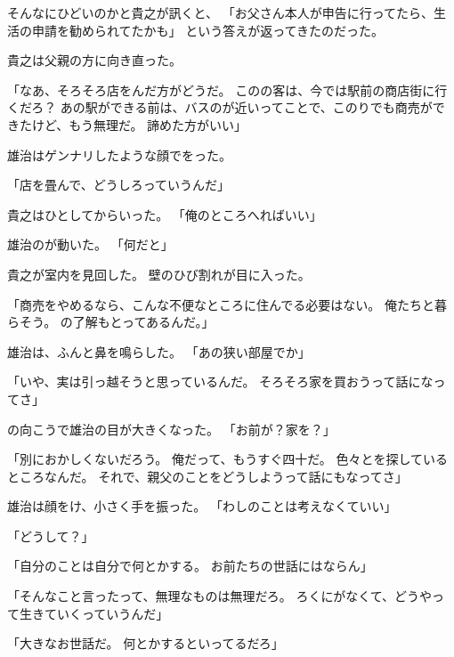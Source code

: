 \documentclass[chapter3.tex]{subfiles}
\begin{document}
\begin{CJK}{UTF8}{ipxm}
    そんなにひどいのかと貴之が訊くと、
    「お父さん本人が申告に行ってたら、生活の申請を勧められてたかも」
    という答えが返ってきたのだった。

    貴之は父親の方に向き直った。

    「なあ、そろそろ店をんだ方がどうだ。
    このの客は、今では駅前の商店街に行くだろ？
    あの駅ができる前は、バスのが近いってことで、このりでも商売ができたけど、もう無理だ。
    諦めた方がいい」

    雄治はゲンナリしたような顔でをった。

    「店を畳んで、どうしろっていうんだ」

    貴之はひとしてからいった。
    「俺のところへればいい」

    雄治のが動いた。
    「何だと」

    貴之が室内を見回した。
    壁のひび割れが目に入った。

    「商売をやめるなら、こんな不便なところに住んでる必要はない。
    俺たちと暮らそう。
    の了解もとってあるんだ。」

    雄治は、ふんと鼻を鳴らした。
    「あの狭い部屋でか」

    「いや、実は引っ越そうと思っているんだ。
    そろそろ家を買おうって話になってさ」

    の向こうで雄治の目が大きくなった。
    「お前が？家を？」

    「別におかしくないだろう。
    俺だって、もうすぐ四十だ。
    色々とを探しているところなんだ。
    それで、親父のことをどうしようって話にもなってさ」

    雄治は顔をけ、小さく手を振った。
    「わしのことは考えなくていい」

    「どうして？」

    「自分のことは自分で何とかする。
    お前たちの世話にはならん」

    「そんなこと言ったって、無理なものは無理だろ。
    ろくにがなくて、どうやって生きていくっていうんだ」

    「大きなお世話だ。
    何とかするといってるだろ」

\end{CJK}
\end{document}
